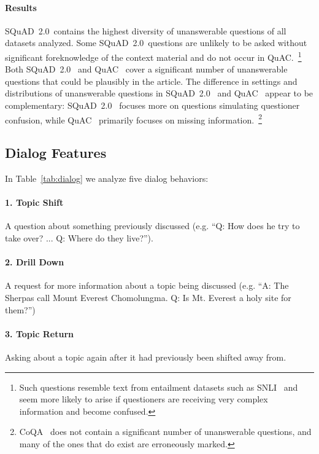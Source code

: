 \documentclass[11pt,a4paper]{article}
\newcommand{\quact}[0]{QuAC}
\newcommand{\coqa}[0]{CoQA}
\newcommand{\squad}[0]{SQuAD~2.0}
\begin{document}
\paragraph{Results}
\squad~contains the highest diversity of unanswerable questions of all datasets analyzed. 
Some \squad~questions are unlikely to be asked without significant foreknowledge of the context material and do not occur in \quact.~\footnote{Such questions resemble text from entailment datasets such as SNLI~\cite{bowman2015large} and seem more likely to arise if questioners are receiving very complex information and become confused.}
Both \squad~ and \quact~ cover a significant number of unanswerable questions that could be plausibly in the article.
The difference in settings and distributions of unanswerable questions in \squad~ and \quact~ appear to be complementary: \squad~ focuses more on questions simulating questioner confusion, while \quact~ primarily focuses on missing information.~\footnote{\coqa~ does not contain a significant number of unanswerable questions, and many of the ones that do exist are erroneously marked.}





\subsection{Dialog Features}
\label{sec:dialog}
In Table~\ref{tab:dialog} we analyze five dialog behaviors:
    \vspace{-7pt}
    \paragraph{1. Topic Shift} A question about something previously discussed (e.g. ``Q: How does he try to take over? ... Q: Where do they live?'').
    \vspace{-7pt}
    \paragraph{2. Drill Down} A request for more information about a topic being discussed (e.g. ``A: The Sherpas call Mount Everest Chomolungma. Q: Is Mt. Everest a holy site for them?'')
    \vspace{-7pt}
    \paragraph{3. Topic Return} Asking about a topic again after it had previously been shifted away from.
    \vspace{-7pt}
\end{document}
